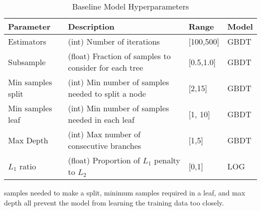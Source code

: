 \documentclass[11pt]{article}
\begin{document}
            \begin{table*}[ht]
            \caption{Baseline Model Hyperparameters} \label{tab:Baseline Model Hyperparameters} 
            \centering
            \begin{tabular}{|| m{3cm} | m{8.75cm}| m{2cm} | m{1.25cm} |}
                \hline
                \textbf{Parameter} & \textbf{Description} & \textbf{Range} & \textbf{Model} \\
                \hline\hline
                Estimators & (int) Number of iterations  & [100,500] & GBDT \\
                \hline
                Subsample & (float) Fraction of samples to consider for each tree & [0.5,1.0] & GBDT \\
                \hline
                Min samples split & (int) Min number of samples needed to split a node & [2,15] & GBDT \\
                \hline
                Min samples leaf & (int) Min number of samples needed in each leaf & [1, 10] & GBDT \\
                \hline
                Max Depth & (int) Max number of consecutive branches & [1,5] & GBDT \\
                \hline
                $L_1$ ratio & (float) Proportion of $L_1$ penalty to $L_2$ & [0,1] & LOG \\
                \hline
            \end{tabular}
            \end{table*}
            \begin{multicols*}{2}

            
            \noindent samples needed to make a split, minimum samples required in a leaf, and max depth all prevent the model from learning the training data too closely.
            
            
        

            
                
                




                        




            


\end{multicols*}
\end{document}
